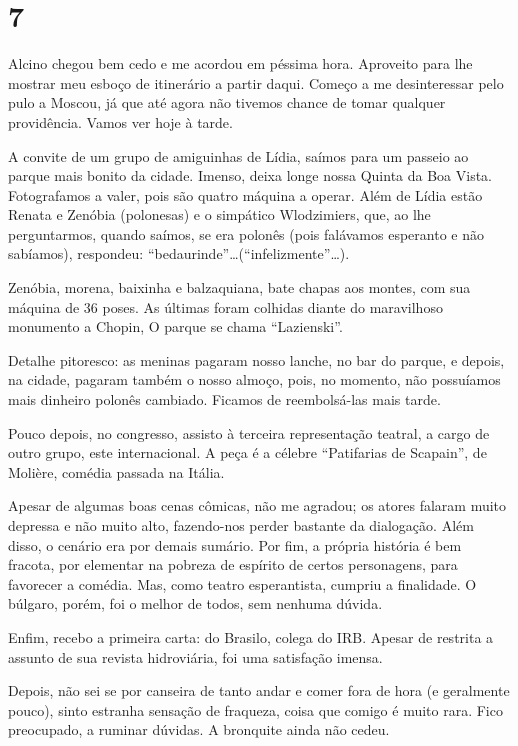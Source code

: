 \section*{7 \adfflatleafright {}}
Alcino chegou bem cedo e me acordou em péssima hora. Aproveito para lhe mostrar meu esboço de itinerário a partir daqui. Começo a me desinteressar pelo pulo a Moscou, já que até agora não tivemos chance de tomar qualquer providência. Vamos ver hoje à tarde.

A convite de um grupo de amiguinhas de Lídia, saímos para um passeio ao parque mais bonito da cidade. Imenso, deixa longe nossa Quinta da Boa Vista. Fotografamos a valer, pois são quatro máquina a operar. Além de Lídia estão Renata e Zenóbia (polonesas) e o simpático Wlodzimiers, que, ao lhe perguntarmos, quando saímos, se era polonês (pois falávamos esperanto e não sabíamos), respondeu: “bedaurinde”\ldots (``in\-fe\-liz\-men\-te''\ldots).

Zenóbia, morena, baixinha e balzaquiana, bate chapas aos montes, com sua máquina de 36 poses. As últimas foram colhidas diante do maravilhoso monumento a Chopin, O parque se chama “Lazienski”.

Detalhe pitoresco: as meninas pagaram nosso lanche, no bar do parque, e depois, na cidade, pagaram também o nosso almoço, pois, no momento, não possuíamos mais dinheiro polonês cambiado. Ficamos de reembolsá-las mais tarde.

Pouco depois, no congresso, assisto à terceira representação teatral, a cargo de outro grupo, este internacional. A peça é a célebre “Patifarias de Scapain”, de Molière, comédia passada na Itália.

Apesar de algumas boas cenas cômicas, não me agradou; os atores falaram muito depressa e não muito alto, fazendo-nos perder bastante da dialogação. Além disso, o cenário era por demais sumário. Por fim, a própria história é bem fracota, por elementar na pobreza de espírito de certos personagens, para favorecer a comédia. Mas, como teatro esperantista, cumpriu a finalidade. O búlgaro, porém, foi o melhor de todos, sem nenhuma dúvida.

Enfim, recebo a primeira carta: do Brasilo, colega do IRB. Apesar de restrita a assunto de sua revista hidroviária, foi uma satisfação imensa.

Depois, não sei se por canseira de tanto andar e comer fora de hora (e geralmente pouco), sinto estranha sensação de fraqueza, coisa que comigo é muito rara. Fico preocupado, a ruminar dúvidas. A bronquite ainda não cedeu.

